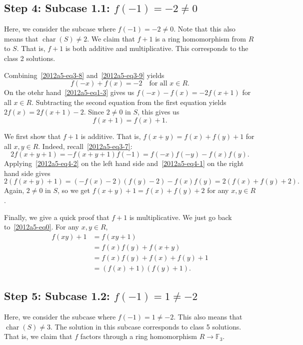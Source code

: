 \documentclass{article}
\newcommand{\F}{\mathbb{F}}
\DeclareMathOperator{\rchar}{char}
\begin{document}
\subsection*{Step 4: Subcase 1.1: $f(-1) = -2 \neq 0$}

Here, we consider the subcase where $f(-1) = -2 \neq 0$.
Note that this also means that $\rchar(S) \neq 2$.
We claim that $f + 1$ is a ring homomorphism from $R$ to $S$.
That is, $f + 1$ is both additive and multiplicative.
This corresponds to the class 2 solutions.

Combining~\eqref{2012a5-eq3-8} and~\eqref{2012a5-eq3-9} yields
\[ f(-x) + f(x) = -2 \quad \text{for all } x \in R. \tag{4.1}\label{2012a5-eq4-1} \]
On the otehr hand~\eqref{2012a5-eq1-3} gives us $f(-x) - f(x) = -2 f(x + 1)$ for all $x \in R$.
Subtracting the second equation from the first equation yields $2 f(x) = 2 f(x + 1) - 2$.
Since $2 \neq 0$ in $S$, this gives us
\[ f(x + 1) = f(x) + 1. \tag{4.2}\label{2012a5-eq4-2} \]

We first show that $f + 1$ is additive.
That is, $f(x + y) = f(x) + f(y) + 1$ for all $x, y \in R$.
Indeed, recall~\eqref{2012a5-eq3-7}:
\[ 2 f(x + y + 1) = -f(x + y + 1) f(-1) = f(-x) f(-y) - f(x) f(y). \]
Applying~\eqref{2012a5-eq4-2} on the left hand side and~\eqref{2012a5-eq4-1} on the right hand side gives
\[ 2 (f(x + y) + 1) = (-f(x) - 2)(f(y) - 2) - f(x) f(y) = 2 (f(x) + f(y) + 2). \]
Again, $2 \neq 0$ in $S$, so we get $f(x + y) + 1 = f(x) + f(y) + 2$ for any $x, y \in R$.

Finally, we give a quick proof that $f + 1$ is multiplicative.
We just go back to~\eqref{2012a5-eq0}.
For any $x, y \in R$,
\begin{align*}
    f(xy) + 1
    &= f(xy + 1) \\
    &= f(x) f(y) + f(x + y) \\
    &= f(x) f(y) + f(x) + f(y) + 1 \\
    &= (f(x) + 1)(f(y) + 1).
\end{align*}









\subsection*{Step 5: Subcase 1.2: $f(-1) = 1 \neq -2$}

Here, we consider the subcase where $f(-1) = 1 \neq -2$.
This also means that $\rchar(S) \neq 3$.
The solution in this subcase corresponds to class 5 solutions.
That is, we claim that $f$ factors through a ring homomorphism $R \to \F_3$.
\end{document}
